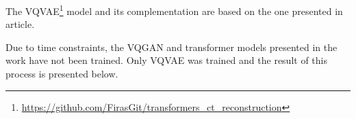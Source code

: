The VQVAE\footnote{\url{https://github.com/FirasGit/transformers_ct_reconstruction}} model and its complementation are based on the one presented in article\cite{khader_transformers_2023}.

Due to time constraints, the VQGAN and transformer models presented in the work have not been trained. Only VQVAE was trained and the result of this process is presented below. 

